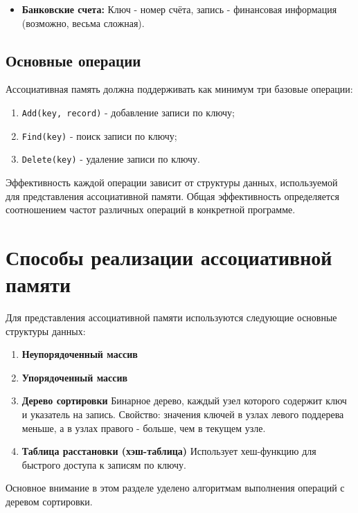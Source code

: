 {\begin{itemize}
  \item \textbf{Банковские счета:}  
  Ключ - номер счёта, запись - финансовая информация (возможно, весьма сложная).
\end{itemize}

\subsection*{Основные операции}

Ассоциативная память должна поддерживать как минимум три базовые операции:

\begin{enumerate}
  \item \texttt{Add(key, record)} - добавление записи по ключу;
  \item \texttt{Find(key)} - поиск записи по ключу;
  \item \texttt{Delete(key)} - удаление записи по ключу.
\end{enumerate}

Эффективность каждой операции зависит от структуры данных, используемой для представления ассоциативной памяти.  
Общая эффективность определяется соотношением частот различных операций в конкретной программе.

\section*{Способы реализации ассоциативной памяти}

Для представления ассоциативной памяти используются следующие основные структуры данных:

\begin{enumerate}
  \item \textbf{Неупорядоченный массив}

  \item \textbf{Упорядоченный массив}  

  \item \textbf{Дерево сортировки}  
  Бинарное дерево, каждый узел которого содержит ключ и указатель на запись.  
  Свойство: значения ключей в узлах левого поддерева меньше, а в узлах правого - больше, чем в текущем узле.

  \item \textbf{Таблица расстановки (хэш-таблица)}  
  Использует хеш-функцию для быстрого доступа к записям по ключу.
\end{enumerate}

Основное внимание в этом разделе уделено алгоритмам выполнения операций с деревом сортировки.



    \newpage
}
